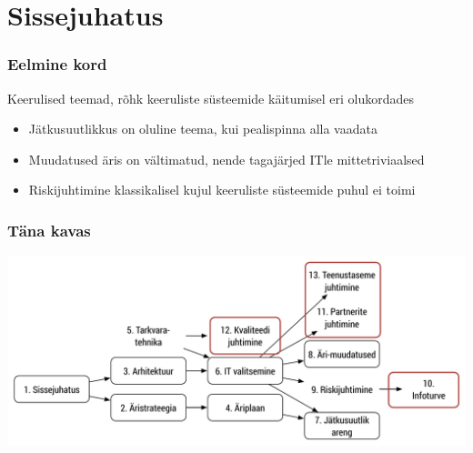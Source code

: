 

\maketitle

\section{Sissejuhatus}
\begin{frame}[fragile]
  \frametitle{Eelmine kord}
  Keerulised teemad, rõhk keeruliste süsteemide käitumisel eri olukordades
	\begin{itemize}
		\item Jätkusuutlikkus on oluline teema, kui pealispinna alla vaadata
		\item Muudatused äris on vältimatud, nende tagajärjed ITle mittetriviaalsed
		\item Riskijuhtimine klassikalisel kujul keeruliste süsteemide puhul ei toimi
	\end{itemize}
\end{frame}

\begin{frame}[fragile]
  \frametitle{Täna kavas}
		\includegraphics[width=\textwidth]{aine_struktuur_neljas.pdf}
\end{frame}
